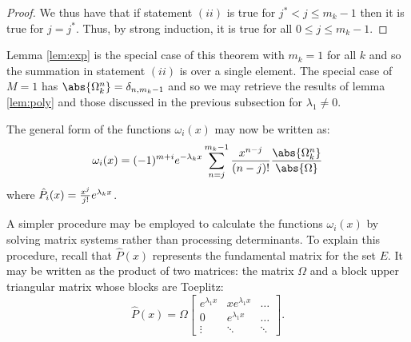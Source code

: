 \documentclass{article}
\begin{document}
\begin{proof}
We thus have that if statement $(ii)$ is true for $j^* < j \leq m_k-1$ then it is true for $j=j^*$.
Thus, by strong induction, it is true for all $0 \leq j \leq m_k-1$.
\end{proof}

Lemma \ref{lem:exp} is the special case of this theorem with $m_k = 1$ for all $k$ and so the summation in statement $(ii)$ is over a single element.
The special case of $M=1$ has $\abs{\Omega_k^n} = \delta_{n,m_k-1}$ and so we may retrieve the results of lemma \ref{lem:poly} and those discussed in the previous subsection for $\lambda_1 \neq 0$.

The general form of the functions $\omega_i(x)$ may now be written as:
\begin{equation*}
\omega_i(x) = (-1)^{m+i} e^{-\lambda_k x} \sum_{n=j}^{m_k-1} \poly{n-j} \frac{\abs{\Omega_k^n}}{\abs{\Omega}}
\end{equation*}
where $\hat{P}_i(x) = \frac{x^j}{j!} e^{\lambda_k x}$.

A simpler procedure may be employed to calculate the functions $\omega_i(x)$ by solving matrix systems rather than processing determinants.
To explain this procedure, recall that $\hat{P}(x)$ represents the fundamental matrix for the set $E$.
It may be written as the product of two matrices: the matrix $\Omega$ and a block upper triangular matrix whose blocks are Toeplitz:
\begin{equation*}
\hat{P}(x) = \Omega \begin{bmatrix} e^{\lambda_1 x} & x e^{\lambda_1 x} & \dots \\
0 & e^{\lambda_1 x} & \dots \\
\vdots & \ddots & \ddots \end{bmatrix}.
\end{equation*}
\end{document}
